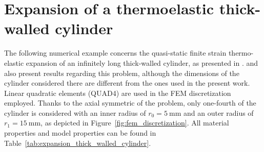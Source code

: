 %

\section{Expansion of a thermoelastic thick-walled cylinder}

The following numerical example concerns the quasi-static finite strain thermo-elastic expansion of an infinitely long thick-walled cylinder, as presented in \cite{ibrahimbegovic_thermodynamics_2009}.
\cite{armero_new_1992} and \cite{erbts_accelerated_2012} also present results regarding this problem, although the dimensions of the cylinder considered there are different from the ones used in the present work.
Linear quadratic elements (QUAD4) are used in the FEM discretization employed.
Thanks to the axial symmetric of the problem, only one-fourth of the cylinder is considered with an inner radius of \(r_{0}=5 \mathrm{~mm}\) and an outer radius of \(r_{1}=15 \mathrm{~mm}\), as depicted in Figure~\ref{fig:fem_discretization}.
All material properties and model properties can be found in Table~\ref{tab:expansion_thick_walled_cylinder}.

